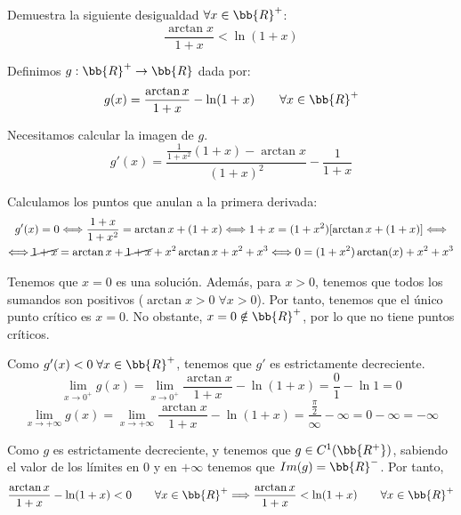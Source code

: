 \documentclass[12pt]{article}
\begin{document}
\begin{ejercicio}
    Demuestra la siguiente desigualdad $\forall x\in \bb{R}^+$:
    \begin{equation*}
        \frac{\arctan x}{1+x} < \ln(1+x)
    \end{equation*}

    Definimos $g:\bb{R}^+ \to \bb{R}$ dada por:
    \begin{equation*}
        g(x)=\frac{\arctan x}{1+x} - \ln(1+x) \qquad \forall x \in \bb{R}^+
    \end{equation*}

    Necesitamos calcular la imagen de $g$.
    \begin{equation*}
        g'(x)=\frac{\frac{1}{1+x^2}(1+x)-\arctan x}{(1+x)^2} -\frac{1}{1+x}
    \end{equation*}

    Calculamos los puntos que anulan a la primera derivada:
    \begin{multline*}
        g'(x)=0 \Longleftrightarrow \frac{1+x}{1+x^2} = \arctan x +(1+x) \Longleftrightarrow 1+x = (1+x^2)[\arctan x +(1+x)]
        \Longleftrightarrow \\ \Longleftrightarrow
        \cancel{1+x} = \arctan x +\cancel{1+x} + x^2 \arctan x + x^2 + x^3 \Longleftrightarrow 0=(1+x^2)\arctan (x) +x^2 + x^3
    \end{multline*}

    Tenemos que $x=0$ es una solución. Además, para $x>0$, tenemos que todos los sumandos son positivos ($\arctan x>0 \;\forall x>0$). Por tanto, tenemos que el único punto crítico es $x=0$. No obstante, $x=0\notin \bb{R}^+$, por lo que no tiene puntos críticos.

    Como $g'(x)<0 \;\forall x\in \bb{R}^+$, tenemos que $g'$ es estrictamente decreciente.
    \begin{equation*}
        \lim_{x\to 0^+} g(x) = \lim_{x\to 0^+} \frac{\arctan x}{1+x} - \ln(1+x) = \frac{0}{1} -\ln 1 = 0
    \end{equation*}
    \begin{equation*}
        \lim_{x\to +\infty} g(x) = \lim_{x\to +\infty} \frac{\arctan x}{1+x} - \ln(1+x) = \frac{\frac{\pi}{2}}{\infty} - \infty = 0-\infty = -\infty
    \end{equation*}

    Como $g$ es estrictamente decreciente, y tenemos que $g\in C^1(\bb{R^+})$, sabiendo el valor de los límites en 0 y en $+\infty$ tenemos que $Im(g)=\bb{R}^-$. Por tanto,
    \begin{equation*}
        \frac{\arctan x}{1+x} - \ln(1+x)<0 \qquad \forall x \in \bb{R}^+
        \Longrightarrow 
        \frac{\arctan x}{1+x} < \ln(1+x) \qquad \forall x \in \bb{R}^+
    \end{equation*}
\end{ejercicio}
\end{document}
